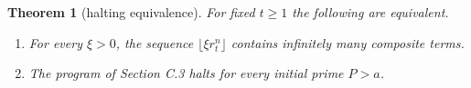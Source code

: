 \documentclass[11pt,reqno]{amsart}
\newtheorem{theorem}{Theorem}
\theoremstyle{definition}
\theoremstyle{remark}
\begin{document}
\begin{samepage}
\begin{theorem}[halting equivalence]\leavevmode\label{thm:58}
For fixed \(t\ge1\) the following
are equivalent.

\begin{enumerate}
\def\labelenumi{(\Alph{enumi})}
\item
  For every \(\xi>0\), the sequence \(\lfloor\xi r_t^n\rfloor\)
  contains infinitely many composite terms.
\item
  The program of Section C.3 halts for every initial prime \(P>a\).
\end{enumerate}
\label{thm-end:58}
\end{theorem}
\end{samepage}
\end{document}

